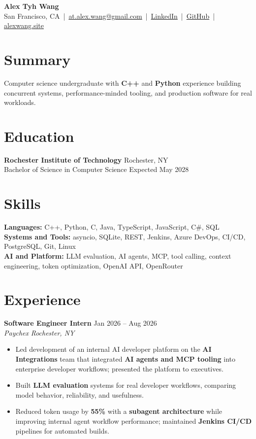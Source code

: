 \documentclass[10pt,letterpaper]{article}
\newif\ifresumeFirstRole
\newcommand{\resumeRole}[4]{%
  \ifresumeFirstRole
    \global\resumeFirstRolefalse
  \else
    \vspace{0pt plus 1fill}%
  \fi
  \textbf{#1} \hfill #2\\
  \textit{#3} \hfill \textit{#4}
}
\begin{document}
\begin{center}
{\Large \textbf{Alex Tyh Wang}}\\
San Francisco, CA \,|\, \href{mailto:at.alex.wang@gmail.com}{at.alex.wang@gmail.com} \,|\, \href{https://www.linkedin.com/in/alex-tyh-wang/}{LinkedIn} \,|\, \href{https://github.com/alextyhwang}{GitHub} \,|\, \href{https://alexwang.site}{alexwang.site}
\end{center}

\section*{Summary}
Computer science undergraduate with \textbf{C++} and \textbf{Python} experience building concurrent systems, performance-minded tooling, and production software for real workloads.

\section*{Education}
\textbf{Rochester Institute of Technology} \hfill Rochester, NY\\
Bachelor of Science in Computer Science \hfill Expected May 2028

\section*{Skills}
\textbf{Languages:} C++, Python, C, Java, TypeScript, JavaScript, C\#, SQL\\
\textbf{Systems and Tools:} asyncio, SQLite, REST, Jenkins, Azure DevOps, CI/CD, PostgreSQL, Git, Linux\\
\textbf{AI and Platform:} LLM evaluation, AI agents, MCP, tool calling, context engineering, token optimization, OpenAI API, OpenRouter

\section*{Experience}
\resumeRole{Software Engineer Intern}{Jan 2026 -- Aug 2026}{Paychex}{Rochester, NY}
\begin{itemize}
  \item Led development of an internal AI developer platform on the \textbf{AI Integrations} team that integrated \textbf{AI agents and MCP tooling} into enterprise developer workflows; presented the platform to executives.
  \item Built \textbf{LLM evaluation} systems for real developer workflows, comparing model behavior, reliability, and usefulness.
  \item Reduced token usage by \textbf{55\%} with a \textbf{subagent architecture} while improving internal agent workflow performance; maintained \textbf{Jenkins CI/CD} pipelines for automated builds.
\end{itemize}
\end{document}
